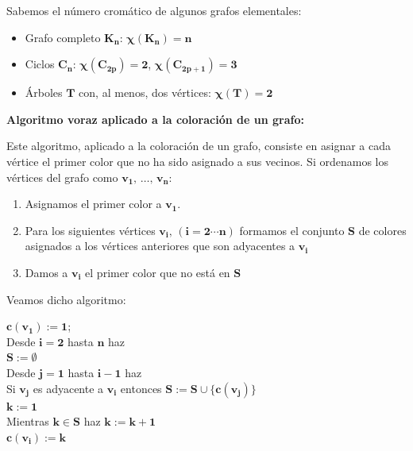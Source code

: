 \documentclass[twoside]{report}
\newcommand{\bs}[1]{\boldsymbol{#1}}
\begin{document}
\vspace{0.4cm}
\noindent Sabemos el número cromático de algunos grafos elementales:

\begin{itemize}
\item Grafo completo $\bs{K_n}$: $\bs{\chi(K_n)=n}$

\item Ciclos $\bs{C_n}$: $\bs{\chi(C_{2p})=2}$, $\bs{\chi(C_{2p+1})=3}$

\item \'{A}rboles $\bs{T}$ con, al menos, dos v\'{e}rtices: $\bs{\chi(T)=2}$
\end{itemize}
\vspace{0.5cm}

\noindent\textbf{Algoritmo voraz aplicado a la coloración de un grafo:}
\vspace{0.2cm}

Este algoritmo, aplicado a la coloraci\'{o}n de un grafo, consiste en asignar a cada v\'{e}rtice el primer color que no ha sido asignado a sus
vecinos. Si ordenamos los v\'{e}rtices del grafo como $\bs{v_1,\,\ldots,\,v_n}$:
\vspace{0.2cm}

        \begin{enumerate}
            \item Asignamos el primer color a $\bs{v_1}$.
            \item Para los siguientes v\'{e}rtices $\bs{v_i,\,(i=2\cdots n)}$ formamos el conjunto $\bs{S}$ de colores asignados a los v\'{e}rtices anteriores que son adyacentes a $\bs{v_i}$
            \item Damos a $\bs{v_i}$ el primer color que no est\'{a} en $\bs{S}$
        \end{enumerate}

\vspace{0.2cm}
Veamos dicho algoritmo:
\vspace{0.2cm}

        \noindent $\bs{c(v_1):=1}$;\\[1ex]
        \textsf{Desde} $\bs{i=2}$ \textsf{hasta} $\bs{n}$ \textsf{haz}\\[1ex]
        \hspace*{5ex} $\bs{S:=\emptyset}$\\
        \hspace*{5ex} \textsf{Desde} $\bs{j=1}$ \textsf{hasta} $\bs{i-1}$ \textsf{haz}\\[1ex]
        \hspace*{10ex} \textsf{Si} $\bs{v_j}$ es adyacente a $\bs{v_i}$ \textsf{entonces} $\bs{S:=S\cup\{c(v_j)\}}$\\[1ex]
        \hspace*{5ex} $\bs{k:=1}$\\[1ex]
        \hspace*{5ex} \textsf{Mientras} $\bs{k\in S}$ \textsf{haz} $\bs{k:=k+1}$\\[1ex]
        \hspace*{5ex} $\bs{c(v_i):=k}$
\end{document}
